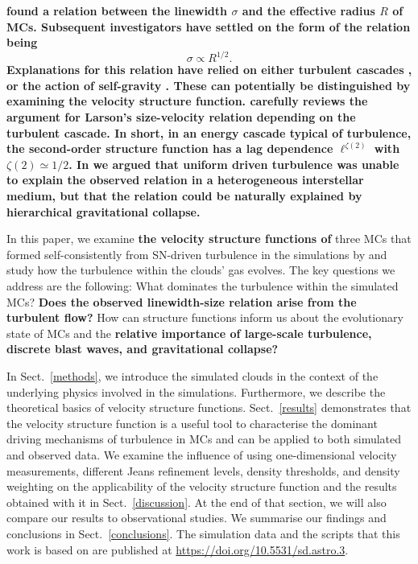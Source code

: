 \textbf{\citet{Larson1981} found a relation between the linewidth $\sigma$ and the effective radius $R$ of MCs.  Subsequent investigators have settled on the form of the relation being \citep{Solomon1987,Falgarone2009,Heyer2009}}
\begin{equation} \label{eq:larson}
\sigma \propto R^{1/2}.
\end{equation}
\textbf{Explanations for this relation have relied on either turbulent cascades \citep{Larson1981,Kritsuk2013,Kritsuk2015,Gnedin2015,Padoan2016}, or the action of self-gravity \citep{Elmegreen1993,Vazquez2006,Elmegreen2007,Heyer2009,Ballesteros2011}.  These can potentially be distinguished by examining the velocity structure function.
\citet{Kritsuk2013} carefully reviews the argument for Larson's size-velocity relation depending on the turbulent cascade. In short, in an energy cascade typical of turbulence, the second-order structure function has a lag dependence $\ell^{\zeta(2)}$  with $\zeta(2) \simeq 1/2$. In \citet[hereafter ]{IbanezMejia2016} we argued that uniform driven turbulence was unable to explain the observed relation in a heterogeneous interstellar medium, but that the relation could be naturally explained by hierarchical gravitational collapse.}

In this paper, we examine \textbf{the velocity structure functions of} three MCs that formed self-consistently from SN-driven turbulence in the simulations by \citet[hereafter  and ]{IbanezMejia2016,IbanezMejia2017} and study how the turbulence within the clouds' gas evolves.
The key questions we address are the following:  What dominates the turbulence within the simulated MCs? \textbf{Does the observed linewidth-size relation arise from the turbulent flow?}
How can structure functions inform us about the evolutionary state of MCs and the %
\textbf{relative importance of large-scale turbulence, discrete blast waves, and gravitational collapse?}

In Sect.~\ref{methods}, we introduce the simulated clouds in the context of the underlying physics involved in the simulations.
Furthermore, we describe the theoretical basics of velocity structure functions.
Sect.~\ref{results} demonstrates that the velocity structure function is a useful tool to characterise the dominant driving mechanisms of turbulence in MCs and can be applied to both simulated and observed data. 
We examine the influence of using one-dimensional velocity measurements, different Jeans refinement levels, density thresholds, and density weighting on the applicability of the velocity structure function and the results obtained with it in Sect.~\ref{discussion}.  
At the end of that section, we will also compare our results to observational studies.
We summarise our findings and conclusions in Sect.~\ref{conclusions}.  The simulation data and the scripts that this work is based on are published 
at {\url{https://doi.org/10.5531/sd.astro.3}}.




\endinput
